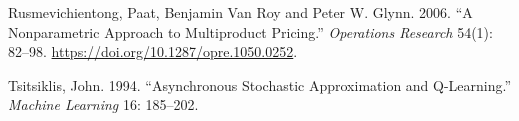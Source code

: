 \documentclass[preprint,12pt,authoryear]{elsarticle}
\begin{document}
\begin{thebibliography}{00}
Rusmevichientong, Paat, Benjamin Van Roy and Peter W. Glynn. 2006. “A Nonparametric Approach to Multiproduct Pricing.” \emph{Operations Research} 54(1): 82--98. {\url{https://doi.org/10.1287/opre.1050.0252}}.

Tsitsiklis, John. 1994. “Asynchronous Stochastic Approximation and Q-Learning.” \emph{Machine Learning} 16: 185--202.



\end{thebibliography}
\end{document}

